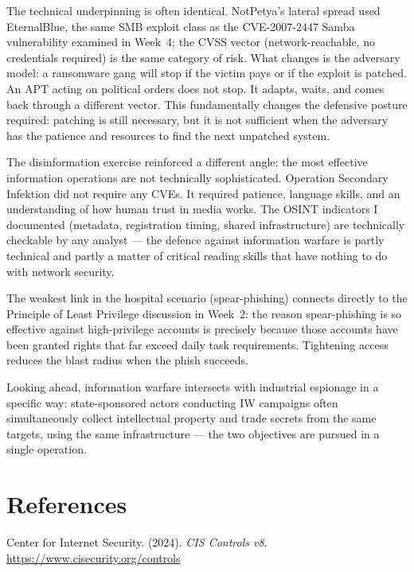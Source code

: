 \documentclass[11pt,a4paper]{article}
\begin{document}
The technical underpinning is often identical. NotPetya's lateral spread used
EternalBlue, the same SMB exploit class as the CVE-2007-2447 Samba vulnerability
examined in Week~4; the CVSS vector (network-reachable, no credentials required)
is the same category of risk. What changes is the adversary model: a ransomware
gang will stop if the victim pays or if the exploit is patched. An APT acting
on political orders does not stop. It adapts, waits, and comes back through a
different vector. This fundamentally changes the defensive posture required:
patching is still necessary, but it is not sufficient when the adversary has
the patience and resources to find the next unpatched system.

The disinformation exercise reinforced a different angle: the most effective
information operations are not technically sophisticated. Operation Secondary
Infektion did not require any CVEs. It required patience, language skills, and
an understanding of how human trust in media works. The OSINT indicators I
documented (metadata, registration timing, shared infrastructure) are technically
checkable by any analyst --- the defence against information warfare is partly
technical and partly a matter of critical reading skills that have nothing to
do with network security.

The weakest link in the hospital scenario (spear-phishing) connects directly
to the Principle of Least Privilege discussion in Week~2: the reason spear-phishing
is so effective against high-privilege accounts is precisely because those accounts
have been granted rights that far exceed daily task requirements. Tightening
access reduces the blast radius when the phish succeeds.

Looking ahead, information warfare intersects with industrial espionage in a
specific way: state-sponsored actors conducting IW campaigns often simultaneously
collect intellectual property and trade secrets from the same targets, using the
same infrastructure --- the two objectives are pursued in a single operation.


\section*{References}

\setlength{\parindent}{0pt}
\setlength{\parskip}{4pt}

\hangindent=1.27cm
Center for Internet Security. (2024). \textit{CIS Controls v8}. \url{https://www.cisecurity.org/controls}
\end{document}
